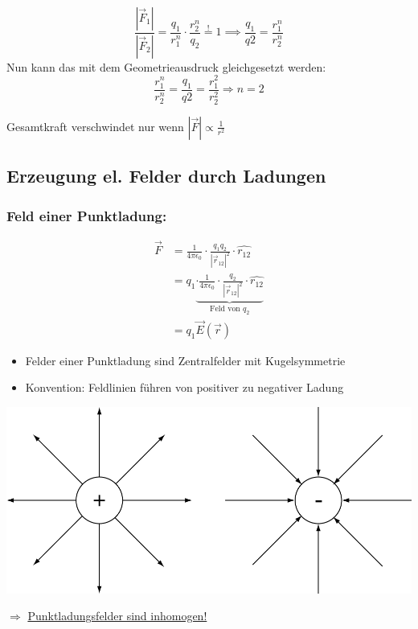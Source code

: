 \documentclass[11pt]{article}
\begin{document}
$$\frac{|\vec{F}_1|}{|\vec{F}_2|} = \frac{q_1}{r_1^n}\cdot \frac{r_2^n}{q_2} \overset{!}{=} 1 \implies \frac{q_1}{q2}=\frac{r_1^n}{r_2^n}$$
Nun kann das mit dem Geometrieausdruck gleichgesetzt werden:
$$\frac{r_1^n}{r_2^n}=\frac{q_1}{q2}=\frac{r_1^2}{r_2^2}\Rightarrow n=2$$

Gesamtkraft verschwindet nur wenn $|\vec{F}| \propto \frac{1}{r^2}$

\subsection{Erzeugung el. Felder durch Ladungen}

	\subsubsection{Feld einer Punktladung:}
	
	\begin{align*}
		\vec{F} &= \frac{1}{4\pi\epsilon_0} \cdot \frac{q_1 q_2}{ |\vec{r}_{12}|^2 } \cdot \hat{r_{12}} \\
					&=q_1 \underbrace{ \cdot \frac{1}{4\pi\epsilon_0} \cdot \frac{q_2}{ |\vec{r}_{12}|^2 } \cdot \hat{r_{12}}  }_{\text{Feld von }q_2} \\
					&=q_1 \vec{E}(\vec{r})
	\end{align*}
	\begin{itemize}
		\item Felder einer Punktladung sind Zentralfelder mit Kugelsymmetrie
		\item Konvention: Feldlinien führen von positiver zu negativer Ladung
	\end{itemize}
	\begin{center}
		\includegraphics[width=0.7\linewidth]{skizzen/14/14_4B0}
	\end{center}

	$ \Rightarrow $ \underline{Punktladungsfelder sind inhomogen!}
	
\end{document}
